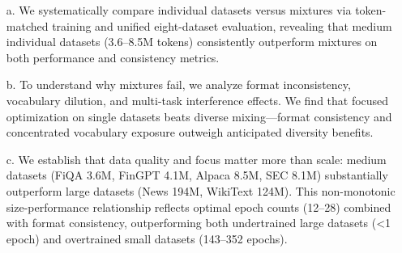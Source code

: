 \documentclass[11pt,a4paper,english,oneside]{book}
\begin{document}
\begin{itemize}
    \item[a.] We systematically compare individual datasets versus mixtures via token-matched training and unified eight-dataset evaluation, revealing that medium individual datasets (3.6–8.5M tokens) consistently outperform mixtures on both performance and consistency metrics.

    \item[b.] To understand why mixtures fail, we analyze format inconsistency, vocabulary dilution, and multi-task interference effects. We find that focused optimization on single datasets beats diverse mixing—format consistency and concentrated vocabulary exposure outweigh anticipated diversity benefits.

    \item[c.] We establish that data quality and focus matter more than scale: medium datasets (FiQA 3.6M, FinGPT 4.1M, Alpaca 8.5M, SEC 8.1M) substantially outperform large datasets (News 194M, WikiText 124M). This non-monotonic size-performance relationship reflects optimal epoch counts (12–28) combined with format consistency, outperforming both undertrained large datasets (<1 epoch) and overtrained small datasets (143–352 epochs).
\end{itemize}

\newpage

\tableofcontents
\listoffigures
\listoftables

\newpage
{}









\printbibliography

\newpage

\thispagestyle{firststyle}
\end{document}
